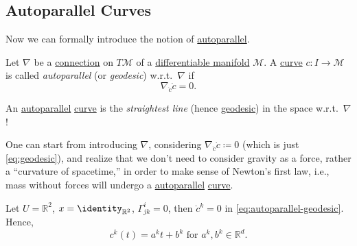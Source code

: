 \subsection{Autoparallel Curves}
Now we can formally introduce the notion of \hyperref[def:autoparallel]{autoparallel}.

\begin{definition}[Autoparallel]\label{def:autoparallel}
	Let \(\nabla \) be a \hyperref[def:linear-connection]{connection} on \(T \mathcal{M} \) of a \hyperref[def:smooth-manifold]{differentiable manifold} \(\mathcal{M} \). A \hyperref[def:curve]{curve} \(c\colon I \to \mathcal{M} \) is called \emph{autoparallel} (or \emph{geodesic}) w.r.t.\ \(\nabla \) if
	\[
		\nabla _{\dot{c}}\dot{c} = 0.
	\]
\end{definition}

\begin{intuition}
	An \hyperref[def:autoparallel]{autoparallel} \hyperref[def:curve]{curve} is the \emph{straightest line} (hence \hyperref[def:geodesic]{geodesic}) in the space w.r.t.\ \(\nabla \)!
\end{intuition}

\begin{remark}
	One can start from introducing \(\nabla \), considering \(\nabla _{\dot{c} }\dot{c} \coloneqq 0 \) (which is just \autoref{eq:geodesic}), and realize that we don't need to consider gravity as a force, rather a ``curvature of spacetime,'' in order to make sense of Newton's first law, i.e., mass without forces will undergo a \hyperref[def:autoparallel]{autoparallel} \hyperref[def:curve]{curve}.
\end{remark}

\begin{eg}
	Let \(U = \mathbb{R} ^2\), \(x = \identity_{\mathbb{R} ^2} \), \(\Gamma ^i_{jk} = 0\), then \(\ddot{c} ^k = 0 \) in \autoref{eq:autoparallel-geodesic}. Hence,
	\[
		c^k (t) = a^k t + b^k \text{ for } a^k, b^k\in \mathbb{R} ^d.
	\]
\end{eg}

